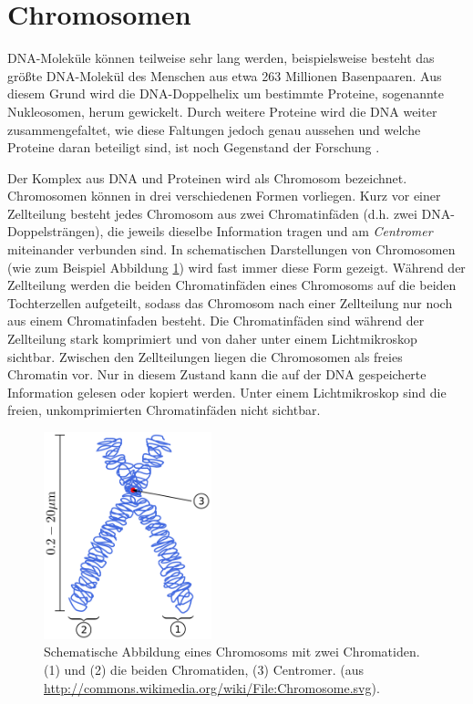 \section{Chromosomen}
\label{sec:bio:chromo}
DNA-Moleküle können teilweise sehr lang werden, beispielsweise besteht das größte DNA-Molekül des Menschen aus etwa 263 Millionen Basenpaaren. Aus diesem Grund wird die DNA-Doppelhelix um bestimmte Proteine, sogenannte Nukleosomen, herum gewickelt. Durch weitere Proteine wird die DNA weiter zusammengefaltet, wie diese Faltungen jedoch genau aussehen und welche Proteine daran beteiligt sind, ist noch Gegenstand der Forschung \citep{Hansen2012}. 

Der Komplex aus DNA und Proteinen wird als Chromosom bezeichnet. Chromosomen können in drei verschiedenen Formen vorliegen. Kurz vor einer Zellteilung besteht jedes Chromosom aus zwei Chromatinfäden (d.h. zwei DNA-Doppelsträngen), die jeweils dieselbe Information tragen und am \emph{Centromer} miteinander verbunden sind. In schematischen Darstellungen von Chromosomen (wie zum Beispiel Abbildung \ref{fig:bio:chromo:chromosom}) wird fast immer diese Form gezeigt. Während der Zellteilung werden die beiden Chromatinfäden eines Chromosoms auf die beiden Tochterzellen aufgeteilt, sodass das Chromosom nach einer Zellteilung nur noch aus einem Chromatinfaden besteht. Die Chromatinfäden sind während der Zellteilung stark komprimiert und von daher unter einem Lichtmikroskop sichtbar. Zwischen den Zellteilungen liegen die Chromosomen als freies Chromatin vor. Nur in diesem Zustand kann die auf der DNA gespeicherte Information gelesen oder kopiert werden. Unter einem Lichtmikroskop sind die freien, unkomprimierten Chromatinfäden nicht sichtbar.

\begin{figure}[htbp]
\begin{center}
\includegraphics[height=6cm]{bilder/Chromosom}
\end{center}
\caption[Schematische Abbildung eines Chromosoms. (aus \protect\url{http://commons.wikimedia.org/wiki/File:Chromosome.svg})] {Schematische Abbildung eines Chromosoms mit zwei Chromatiden. (1) und (2) die beiden Chromatiden, (3) Centromer. (aus \protect\url{http://commons.wikimedia.org/wiki/File:Chromosome.svg}).}
\label{fig:bio:chromo:chromosom}
\end{figure}

